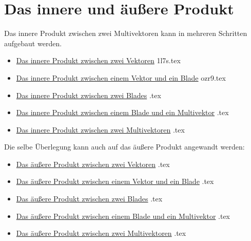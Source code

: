 \documentclass{sajzk}
\begin{document}
\section{Das innere und äußere Produkt}
\label{bzmt}
Das innere Produkt zwischen zwei Multivektoren kann in mehreren Schritten
aufgebaut werden.
\begin{itemize}
    \item \href{1l7s.pdf}{Das innere Produkt zwischen zwei Vektoren} 1l7s.tex
    \item \href{ozr9.pdf}{Das innere Produkt zwischen einem Vektor und ein Blade} ozr9.tex
    \item \href{.pdf}{Das innere Produkt zwischen zwei Blades} .tex
    \item \href{.pdf}{Das innere Produkt zwischen einem Blade und ein Multivektor} .tex
    \item \href{.pdf}{Das innere Produkt zwischen zwei Multivektoren} .tex
\end{itemize}

Die selbe Überlegung kann auch auf das äußere Produkt angewandt werden:
\begin{itemize}
    \item \href{.pdf}{Das äußere Produkt zwischen zwei Vektoren} .tex
    \item \href{.pdf}{Das äußere Produkt zwischen einem Vektor und ein Blade} .tex
    \item \href{.pdf}{Das äußere Produkt zwischen zwei Blades} .tex
    \item \href{.pdf}{Das äußere Produkt zwischen einem Blade und ein Multivektor} .tex
    \item \href{.pdf}{Das äußere Produkt zwischen zwei Multivektoren} .tex
\end{itemize}
\end{document}
